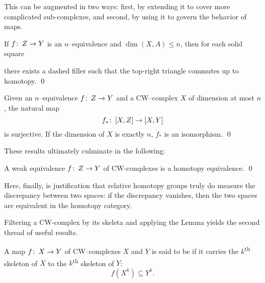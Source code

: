 \noindent
This can be augmented in two ways: first, by extending it to cover more complicated sub-complexes, and second, by using it to govern the behavior of maps.

\begin{lemma}\label{NEquivsLiftNDimlSources}%
If $f\colon\thinspace Z \to Y$ is an $n$--equivalence and $\dim(X, A) \le n$, then for each solid square
\begin{center}
\end{center}
there exists a dashed filler such that the top-right triangle commutes up to homotopy. \qed
{}
\end{lemma}

\begin{corollary}
Given an $n$--equivalence $f\colon\thinspace Z \to Y$ and a CW--complex $X$ of dimension at most $n$, the natural map \[f_*\colon\thinspace [X, Z] \to [X, Y]\] is surjective.
If the dimension of $X$ is exactly $n$, $f_*$ is an isomorphism.
\qed
\end{corollary}

\noindent
These results ultimately culminate in the following:

\begin{corollary}[Whitehead]
A weak equivalence $f\colon\thinspace Z \to Y$ of CW-complexes is a homotopy equivalence.
\qed
\end{corollary}

\noindent
Here, finally, is justification that relative homotopy groups truly do measure the discrepancy between two spaces:
if the discrepancy vanishes, then the two spaces are equivalent in the homotopy category.

Filtering a CW-complex by its skeleta and applying the Lemma yields the second thread of useful results.

\begin{definition}
A map $f\colon\thinspace X \to Y$ of CW--complexes $X$ and $Y$ is said to be  if it carries the $k$\textsuperscript{th} skeleton of $X$ to the $k$\textsuperscript{th} skeleton of $Y$: \[f(X^k) \subseteq Y^k.\]
\end{definition}

